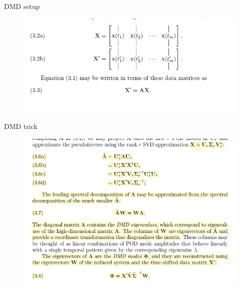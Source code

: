 \documentclass{beamer}
\begin{document}
	\begin{frame}{DMD setup }
		\begin{figure}[h]
			\centering
				\includegraphics[scale=0.6]{../Figures/fig_dmd_fig1.png}
		\end{figure}
	\end{frame}
	
	\begin{frame}{DMD trick}
		\begin{figure}[h]
			\centering
				\includegraphics[scale=0.6]{../Figures/fig_dmd_fig2.png}
		\end{figure}	
	\end{frame}
	
\end{document}
